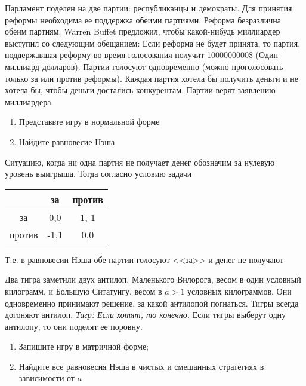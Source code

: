 \begin{problem}
Парламент поделен на две партии: республиканцы и демократы. Для принятия реформы необходима ее поддержка обеими партиями. Реформа безразлична обеим партиям. Warren Buffet предложил, чтобы какой-нибудь миллиардер выступил со следующим обещанием: Если реформа не будет принята, то партия, поддержавшая реформу во время голосования получит 1000000000\$ (Один миллиард долларов). Партии голосуют одновременно (можно проголосовать только за или против реформы). Каждая партия хотела бы получить деньги и не хотела бы, чтобы деньги достались конкурентам. Партии верят заявлению миллиардера.
\begin{enumerate}
\item  Представьте игру в нормальной форме
\item Найдите равновесие Нэша
\end{enumerate}
\end{problem}

\begin{solution}
Ситуацию, когда ни одна партия не получает денег обозначим за нулевую уровень выигрыша. Тогда согласно условию задачи

\begin{tabular}{c|cc}
 & за & против \\ 
\hline 
за & 0,0 & 1,-1 \\ 
против & -1,1 & 0,0 
\end{tabular} 

Т.е. в равновесии Нэша обе партии голосуют <<за>> и денег не получают
\end{solution}

\begin{problem}
Два тигра заметили двух антилоп. Маленького Вилорога, весом в один условный килограмм, и Большую Ситатунгу, весом в  $a>1$  условных килограммов. Они одновременно принимают решение, за какой антилопой погнаться. Тигры всегда догоняют антилоп. {\it Тигр: Если хотят, то конечно.} Если тигры выберут одну антилопу, то они поделят ее поровну.
\begin{enumerate}
\item  Запишите игру в матричной форме;
\item Найдите все равновесия Нэша в чистых и смешанных стратегиях в зависимости от  $a$
\end{enumerate}
\end{problem}

